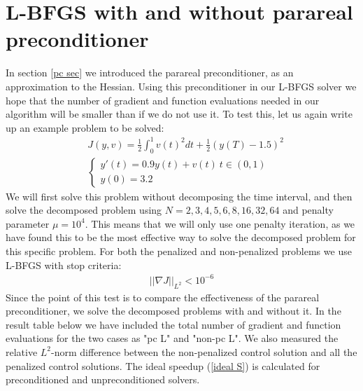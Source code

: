\section{L-BFGS with and without parareal preconditioner}
In section \ref{pc sec} we introduced the parareal preconditioner, as an approximation to the Hessian. Using this preconditioner in our L-BFGS solver we hope that the number of gradient and function evaluations needed in our algorithm will be smaller than if we do not use it. To test this, let us again write up an example problem to be solved:
\begin{align*}
&J(y,v) = \frac{1}{2}\int_0^1v(t)^2dt + \frac{1}{2}(y(T)-1.5)^2 \\
&\left\{
     \begin{array}{lr}
       	y'(t)=0.9y(t) + v(t) \ t\in(0,1)\\
       	y(0)=3.2
     \end{array}
   \right. 
\end{align*}
We will first solve this problem without decomposing the time interval, and then solve the decomposed problem using $N=2,3,4,5,6,8,16,32,64$ and penalty parameter $\mu=10^4$. This means that we will only use one penalty iteration, as we have found this to be the most effective way to solve the decomposed problem for this specific problem. For both the penalized and non-penalized problems we use L-BFGS with stop criteria:
\begin{align*}
||\nabla J||_{L^2} <10^{-6}
\end{align*}  
Since the point of this test is to compare the effectiveness of the parareal preconditioner, we solve the decomposed problems with and without it. In the result table below we have included the total number of gradient and function evaluations for the two cases as "pc L" and "non-pc L". We also measured the relative $L^2$-norm difference between the non-penalized control solution and all the penalized control solutions. The ideal speedup (\ref{ideal S}) is calculated for preconditioned and unpreconditioned solvers.
\\
\\
